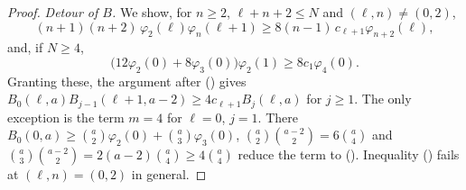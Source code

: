\documentclass[twoside,10pt]{article}
\numberwithin{equation}{section}
\theoremstyle{slbody}
\theoremstyle{definition}
\theoremstyle{remark}
\renewcommand{\eqref}[1]{\textup{{\normalfont(\oldstylenums{\ref{#1}}}\normalfont)}}
\begin{document}
\begin{proof}
\emph{Detour of $B$.} We show, for $n\geq2$, $\ell+n+2\leq N$ and $(\ell,n)\neq(0,2)$,
\begin{equation}\label{eq:cubic-B}
(n+1)(n+2)\,\varphi_2(\ell)\varphi_n(\ell+1)\geq8(n-1)\,c_{\ell+1}\varphi_{n+2}(\ell),
\end{equation}
and, if $N\geq4$,
\begin{equation}\label{eq:cubic-corner}
\bigl(12\varphi_2(0)+8\varphi_3(0)\bigr)\varphi_2(1)\geq8c_1\varphi_4(0).
\end{equation}
Granting these, the argument after \eqref{eq:quad-B} gives $B_0(\ell,a)B_{j-1}(\ell+1,a-2)\geq4c_{\ell+1}B_j(\ell,a)$ for $j\geq1$. The only exception is the term $m=4$ for $\ell=0$, $j=1$. There $B_0(0,a)\geq\binom a2\varphi_2(0)+\binom a3\varphi_3(0)$, $\binom a2\binom{a-2}2=6\binom a4$ and $\binom a3\binom{a-2}2=2(a-2)\binom a4\geq4\binom a4$ reduce the term to \eqref{eq:cubic-corner}. Inequality \eqref{eq:cubic-B} fails at $(\ell,n)=(0,2)$ in general.


\end{proof}
\end{document}
